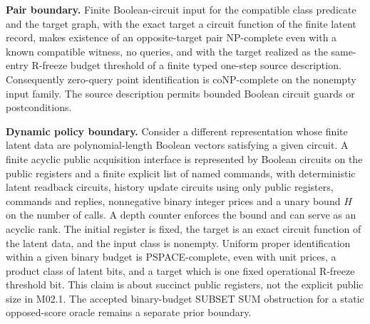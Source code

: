 \begin{theorem}\label{ext:m024}

\textbf{Pair boundary.} Finite Boolean-circuit input for the compatible class predicate and the target graph, with the exact target a circuit function of the finite latent record, makes existence of an opposite-target pair NP-complete even with a known compatible witness, no queries, and with the target realized as the same-entry R-freeze budget threshold of a finite typed one-step source description. Consequently zero-query point identification is coNP-complete on the nonempty input family. The source description permits bounded Boolean circuit guards or postconditions.

\textbf{Dynamic policy boundary.} Consider a different representation whose finite latent data are polynomial-length Boolean vectors satisfying a given circuit. A finite acyclic public acquisition interface is represented by Boolean circuits on the public registers and a finite explicit list of named commands, with deterministic latent readback circuits, history update circuits using only public registers, commands and replies, nonnegative binary integer prices and a unary bound \(H\) on the number of calls. A depth counter enforces the bound and can serve as an acyclic rank. The initial register is fixed, the target is an exact circuit function of the latent data, and the input class is nonempty. Uniform proper identification within a given binary budget is PSPACE-complete, even with unit prices, a product class of latent bits, and a target which is one fixed operational R-freeze threshold bit. This claim is about succinct public registers, not the explicit public size in M02.1. The accepted binary-budget SUBSET SUM obstruction for a static opposed-score oracle remains a separate prior boundary.

\end{theorem}

